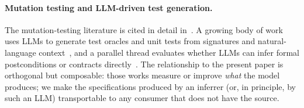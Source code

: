 \paragraph{Mutation testing and LLM-driven test generation.}
The mutation-testing literature is cited in detail in~\cite{edmonds2026inference}. A growing body of work uses LLMs to generate test oracles and unit tests from signatures and natural-language context~\cite{schafer2023adaptive,lemieux2023codamosa,molinelli2025oracles,hossain2024togll,wang2025mutgen,foster2025meta}, and a parallel thread evaluates whether LLMs can infer formal postconditions or contracts directly~\cite{endres2024can,richter2025beyondpostconditions,ma2024specgen,konstantinou2024oracles}. The relationship to the present paper is orthogonal but composable: those works measure or improve \emph{what} the model produces; we make the specifications produced by an inferrer (or, in principle, by such an LLM) transportable to any consumer that does not have the source.
